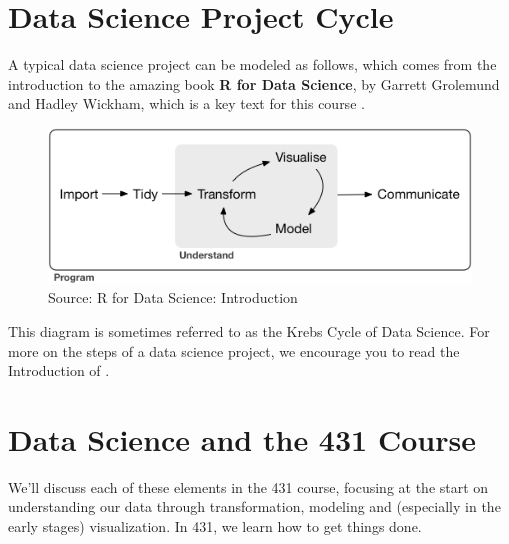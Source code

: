 \documentclass[
]{book}
\begin{document}
\hypertarget{data-science-project-cycle}{%
\section{Data Science Project Cycle}\label{data-science-project-cycle}}

A typical data science project can be modeled as follows, which comes from the introduction to the amazing book \textbf{R for Data Science}, by Garrett Grolemund and Hadley Wickham, which is a key text for this course \citep{R4DS}.

\begin{figure}
\includegraphics[width=0.95\linewidth]{figures/data-science-cycle} \caption{Source: R for Data Science: Introduction}\label{fig:cycle-fig}
\end{figure}

This diagram is sometimes referred to as the Krebs Cycle of Data Science. For more on the steps of a data science project, we encourage you to read the Introduction of \citet{R4DS}.

\hypertarget{data-science-and-the-431-course}{%
\section{Data Science and the 431 Course}\label{data-science-and-the-431-course}}

We'll discuss each of these elements in the 431 course, focusing at the start on understanding our data through transformation, modeling and (especially in the early stages) visualization. In 431, we learn how to get things done.
\end{document}
